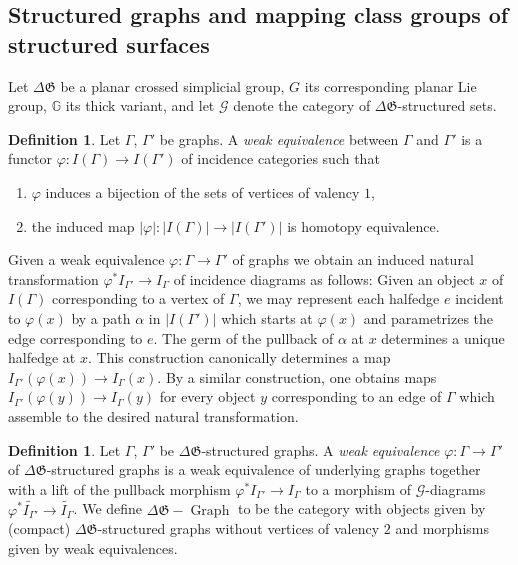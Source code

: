 \documentclass[english,11pt,leqno]{article}
\def\GG{\mathbb{G}}
\def\Gen{\mathfrak{G}}
\def\Gc{\mathcal{G}}
\def\on{\operatorname}
\def\G{ {\mathcal G}}
\def\DGgraph{\DG-\on{Graph}}
\def\DG{ {\Delta \Gen}}
\theoremstyle{definition}
\newtheorem{defi}[thm]{Definition}
\theoremstyle{remark}
\numberwithin{equation}{section}
\begin{document}
 
\subsection {Structured graphs and mapping class groups of structured surfaces}
 
Let $\DG$ be a planar crossed simplicial group, $G$ its corresponding planar Lie group, $\GG$ its
thick variant, and let $\Gc$ denote the category of $\DG$-structured sets. 
 
\begin{defi} Let $\Gamma$, $\Gamma'$ be graphs. A {\em weak equivalence} between $\Gamma$
	and $\Gamma'$ is a functor $\varphi: I(\Gamma) \to I(\Gamma')$ of incidence
	categories such that
	\begin{enumerate}
		\item $\varphi$ induces a bijection of the sets of vertices of valency $1$,
		\item the induced map $|\varphi|: |I(\Gamma)| \to |I(\Gamma')|$ is homotopy
			equivalence.
	\end{enumerate}
\end{defi}

Given a weak equivalence $\varphi: \Gamma \to \Gamma'$ of graphs we obtain an induced natural
transformation $\varphi^* I_{\Gamma'} \to I_{\Gamma}$ of incidence diagrams as follows: Given an
object $x$ of $I(\Gamma)$ corresponding to a vertex of $\Gamma$, we may represent each halfedge $e$ 
incident to $\varphi(x)$ by a path $\alpha$ in $|I(\Gamma')|$ which starts at $\varphi(x)$ and 
parametrizes the edge corresponding to $e$. The germ of the pullback of $\alpha$ at $x$ determines a
unique halfedge at $x$. This construction canonically determines a map $I_{\Gamma'}(\varphi(x)) \to
I_{\Gamma}(x)$. By a similar construction, one obtains maps $I_{\Gamma'}(\varphi(y)) \to
I_{\Gamma}(y)$ for every object $y$ corresponding to an edge of $\Gamma$ which assemble to the
desired natural transformation.

\begin{defi}\label{def:weak-eq-str-graphs}
	Let $\Gamma$, $\Gamma'$ be $\DG$-structured graphs.
	A {\em weak equivalence} $\varphi: \Gamma \to \Gamma'$ of $\DG$-structured graphs is a weak
	equivalence of underlying graphs together with a lift of the pullback morphism 
	$\varphi^* I_{\Gamma'} \to I_{\Gamma}$ to a morphism of $\G$-diagrams $\varphi^*
	\widetilde{I_{\Gamma'}} \to \widetilde{I_{\Gamma}}$.
	We define $\DGgraph$ to be the category with objects given by (compact) $\DG$-structured
	graphs without vertices of valency $2$ and morphisms given by weak equivalences.
\end{defi}
\end{document}
